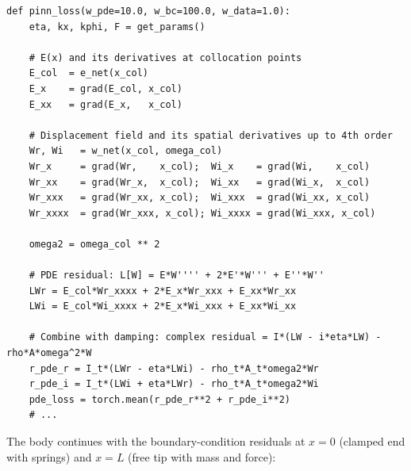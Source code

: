 \documentclass[11pt,a4paper]{article}
\begin{document}
\begin{lstlisting}[caption={PINN loss: PDE residual at collocation points}, label={lst:pde_loss}]
def pinn_loss(w_pde=10.0, w_bc=100.0, w_data=1.0):
    eta, kx, kphi, F = get_params()

    # E(x) and its derivatives at collocation points
    E_col  = e_net(x_col)
    E_x    = grad(E_col, x_col)
    E_xx   = grad(E_x,   x_col)

    # Displacement field and its spatial derivatives up to 4th order
    Wr, Wi   = w_net(x_col, omega_col)
    Wr_x     = grad(Wr,    x_col);  Wi_x    = grad(Wi,    x_col)
    Wr_xx    = grad(Wr_x,  x_col);  Wi_xx   = grad(Wi_x,  x_col)
    Wr_xxx   = grad(Wr_xx, x_col);  Wi_xxx  = grad(Wi_xx, x_col)
    Wr_xxxx  = grad(Wr_xxx, x_col); Wi_xxxx = grad(Wi_xxx, x_col)

    omega2 = omega_col ** 2

    # PDE residual: L[W] = E*W'''' + 2*E'*W''' + E''*W''
    LWr = E_col*Wr_xxxx + 2*E_x*Wr_xxx + E_xx*Wr_xx
    LWi = E_col*Wi_xxxx + 2*E_x*Wi_xxx + E_xx*Wi_xx

    # Combine with damping: complex residual = I*(LW - i*eta*LW) - rho*A*omega^2*W
    r_pde_r = I_t*(LWr - eta*LWi) - rho_t*A_t*omega2*Wr
    r_pde_i = I_t*(LWi + eta*LWr) - rho_t*A_t*omega2*Wi
    pde_loss = torch.mean(r_pde_r**2 + r_pde_i**2)
    # ...
\end{lstlisting}

The body continues with the boundary-condition residuals at $x = 0$ (clamped end with springs) and $x = L$ (free tip with mass and force):
\end{document}
